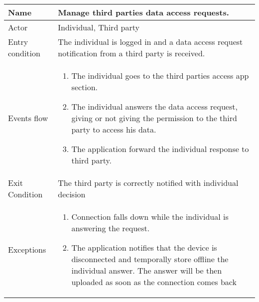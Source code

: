 \begin{tabular}{|l|p{13cm}|}
    \hline
    Name & Manage third parties data access requests.
    \\ \hline
    Actor & Individual, Third party
    \\ \hline 
    Entry condition & The individual is logged in and a data access request notification from a third party is received.
    \\ \hline
    Events flow &
    \begin{enumerate}
	\item The individual goes to the third parties access app section.
    \item The individual answers the data access request, giving or not giving the permission to the third party to access his data.
    \item The application forward the individual response to third party.
    \end{enumerate}
     \\ \hline
     Exit Condition & The third party is correctly notified with individual decision
     \\
    \hline
    Exceptions &
        \begin{enumerate}
    \item Connection falls down while the individual is answering the request.
    \item The application notifies that the device is disconnected and temporally store offline the individual answer. The answer will be then uploaded as soon as the connection comes back
    \end{enumerate}
      \\
\end{tabular}

